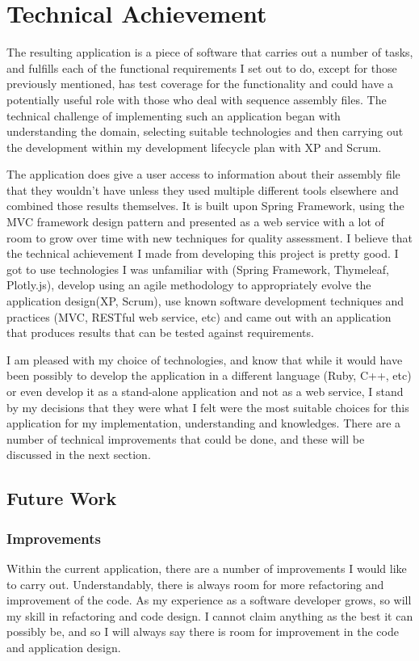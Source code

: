 \section{Technical Achievement}
The resulting application is a piece of software that carries out a number of tasks, and fulfills each of the functional requirements I set out to do, except for those previously mentioned, has test coverage for the functionality and could have a potentially useful role with those who deal with sequence assembly files. The technical challenge of implementing such an application began with understanding the domain, selecting suitable technologies and then carrying out the development within my development lifecycle plan with XP and Scrum.

The application does give a user access to information about their assembly file that they wouldn't have unless they used multiple different tools elsewhere and combined those results themselves. It is built upon Spring Framework, using the MVC framework design pattern and presented as a web service with a lot of room to grow over time with new techniques for quality assessment. I believe that the technical achievement I made from developing this project is pretty good. I got to use technologies I was unfamiliar with (Spring Framework, Thymeleaf, Plotly.js), develop using an agile methodology to appropriately evolve the application design(XP, Scrum), use known software development techniques and practices (MVC, RESTful web service, etc) and came out with an application that produces results that can be tested against requirements.

I am pleased with my choice of technologies, and know that while it would have been possibly to develop the application in a different language (Ruby, C++, etc) or even develop it as a stand-alone application and not as a web service, I stand by my decisions that they were what I felt were the most suitable choices for this application for my implementation, understanding and knowledges. There are a number of technical improvements that could be done, and these will be discussed in the next section.

\subsection{Future Work}
\subsubsection{Improvements}
Within the current application, there are a number of improvements I would like to carry out. Understandably, there is always room for more refactoring and improvement of the code. As my experience as a software developer grows, so will my skill in refactoring and code design. I cannot claim anything as the best it can possibly be, and so I will always say there is room for improvement in the code and application design.

